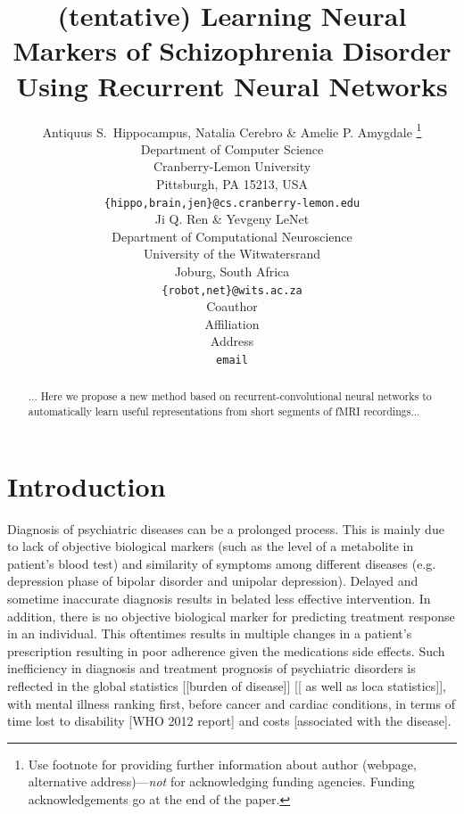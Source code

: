 \documentclass{article} %
\title{(tentative) Learning Neural Markers of Schizophrenia Disorder Using Recurrent Neural Networks}
\author{Antiquus S.~Hippocampus, Natalia Cerebro \& Amelie P. Amygdale \thanks{ Use footnote for providing further information
about author (webpage, alternative address)---\emph{not} for acknowledging
funding agencies.  Funding acknowledgements go at the end of the paper.} \\
Department of Computer Science\\
Cranberry-Lemon University\\
Pittsburgh, PA 15213, USA \\
\texttt{\{hippo,brain,jen\}@cs.cranberry-lemon.edu} \\
\And
Ji Q. Ren \& Yevgeny LeNet \\
Department of Computational Neuroscience \\
University of the Witwatersrand \\
Joburg, South Africa \\
\texttt{\{robot,net\}@wits.ac.za} \\
\AND
Coauthor \\
Affiliation \\
Address \\
\texttt{email}
}
\begin{document}
\maketitle


\begin{abstract}
... Here we propose a new method based on recurrent-convolutional neural networks to automatically learn useful representations from short segments of fMRI recordings...
\end{abstract}

\section{Introduction}
Diagnosis of psychiatric diseases can be a prolonged process. This is mainly due to lack of objective biological markers (such as the level of a metabolite in patient’s blood test) and similarity of symptoms among different diseases (e.g. depression phase of bipolar disorder and unipolar depression). Delayed and sometime inaccurate diagnosis results in belated less effective intervention. In addition, there is no objective biological marker for predicting treatment response in an individual. This oftentimes results in multiple changes in a patient’s prescription resulting in poor adherence given the medications side effects. Such inefficiency in diagnosis and treatment prognosis of psychiatric disorders is reflected in the global statistics [[burden of disease]] [[ as well as loca statistics]], with mental illness ranking first, before cancer and cardiac conditions, in terms of time lost to disability [WHO 2012 report] and costs \citep{Roehrig2016} [associated with the disease].
\end{document}
